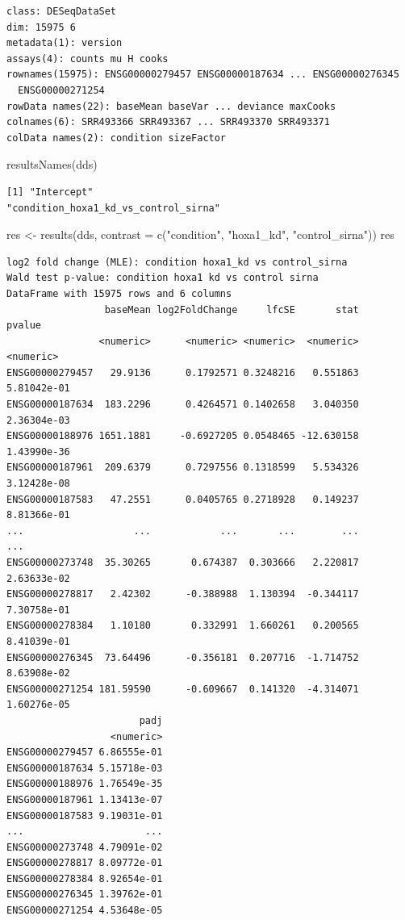 \documentclass[
  letterpaper,
  DIV=11,
  numbers=noendperiod]{scrartcl}
\newenvironment{Shaded}{\begin{snugshade}}{\end{snugshade}}
\newcommand{\AttributeTok}[1]{\textcolor[rgb]{0.40,0.45,0.13}{#1}}
\newcommand{\FunctionTok}[1]{\textcolor[rgb]{0.28,0.35,0.67}{#1}}
\newcommand{\NormalTok}[1]{\textcolor[rgb]{0.00,0.23,0.31}{#1}}
\newcommand{\OtherTok}[1]{\textcolor[rgb]{0.00,0.23,0.31}{#1}}
\newcommand{\StringTok}[1]{\textcolor[rgb]{0.13,0.47,0.30}{#1}}
\begin{document}
\begin{verbatim}
class: DESeqDataSet 
dim: 15975 6 
metadata(1): version
assays(4): counts mu H cooks
rownames(15975): ENSG00000279457 ENSG00000187634 ... ENSG00000276345
  ENSG00000271254
rowData names(22): baseMean baseVar ... deviance maxCooks
colnames(6): SRR493366 SRR493367 ... SRR493370 SRR493371
colData names(2): condition sizeFactor
\end{verbatim}

\begin{Shaded}
\begin{Highlighting}[]
\FunctionTok{resultsNames}\NormalTok{(dds)}
\end{Highlighting}
\end{Shaded}

\begin{verbatim}
[1] "Intercept"                           "condition_hoxa1_kd_vs_control_sirna"
\end{verbatim}

\begin{Shaded}
\begin{Highlighting}[]
\NormalTok{res }\OtherTok{\textless{}{-}} \FunctionTok{results}\NormalTok{(dds, }\AttributeTok{contrast =} \FunctionTok{c}\NormalTok{(}\StringTok{"condition"}\NormalTok{, }\StringTok{"hoxa1\_kd"}\NormalTok{, }\StringTok{"control\_sirna"}\NormalTok{))}
\NormalTok{res}
\end{Highlighting}
\end{Shaded}

\begin{verbatim}
log2 fold change (MLE): condition hoxa1_kd vs control_sirna 
Wald test p-value: condition hoxa1 kd vs control sirna 
DataFrame with 15975 rows and 6 columns
                 baseMean log2FoldChange     lfcSE       stat      pvalue
                <numeric>      <numeric> <numeric>  <numeric>   <numeric>
ENSG00000279457   29.9136      0.1792571 0.3248216   0.551863 5.81042e-01
ENSG00000187634  183.2296      0.4264571 0.1402658   3.040350 2.36304e-03
ENSG00000188976 1651.1881     -0.6927205 0.0548465 -12.630158 1.43990e-36
ENSG00000187961  209.6379      0.7297556 0.1318599   5.534326 3.12428e-08
ENSG00000187583   47.2551      0.0405765 0.2718928   0.149237 8.81366e-01
...                   ...            ...       ...        ...         ...
ENSG00000273748  35.30265       0.674387  0.303666   2.220817 2.63633e-02
ENSG00000278817   2.42302      -0.388988  1.130394  -0.344117 7.30758e-01
ENSG00000278384   1.10180       0.332991  1.660261   0.200565 8.41039e-01
ENSG00000276345  73.64496      -0.356181  0.207716  -1.714752 8.63908e-02
ENSG00000271254 181.59590      -0.609667  0.141320  -4.314071 1.60276e-05
                       padj
                  <numeric>
ENSG00000279457 6.86555e-01
ENSG00000187634 5.15718e-03
ENSG00000188976 1.76549e-35
ENSG00000187961 1.13413e-07
ENSG00000187583 9.19031e-01
...                     ...
ENSG00000273748 4.79091e-02
ENSG00000278817 8.09772e-01
ENSG00000278384 8.92654e-01
ENSG00000276345 1.39762e-01
ENSG00000271254 4.53648e-05
\end{verbatim}
\end{document}
